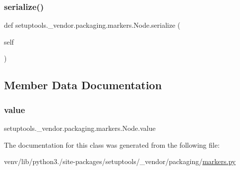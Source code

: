 \subsubsection{\texorpdfstring{serialize()}{serialize()}}
{\footnotesize\ttfamily def setuptools.\+\_\+vendor.\+packaging.\+markers.\+Node.\+serialize (\begin{DoxyParamCaption}\item[{}]{self }\end{DoxyParamCaption})}



\subsection{Member Data Documentation}
\mbox{\label{classsetuptools_1_1__vendor_1_1packaging_1_1markers_1_1Node_add7c503e0d7d38e590d471eb64d253a1}} 
\subsubsection{\texorpdfstring{value}{value}}
{\footnotesize\ttfamily setuptools.\+\_\+vendor.\+packaging.\+markers.\+Node.\+value}



The documentation for this class was generated from the following file\+:\begin{DoxyCompactItemize}
\item 
venv/lib/python3./site-\/packages/setuptools/\+\_\+vendor/packaging/\hyperlink{setuptools_2__vendor_2packaging_2markers_8py}{markers.\+py}\end{DoxyCompactItemize}

